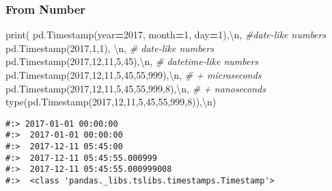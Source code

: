 \documentclass[
]{book}
\newenvironment{Shaded}{\begin{snugshade}}{\end{snugshade}}
\newcommand{\BuiltInTok}[1]{#1}
\newcommand{\CharTok}[1]{\textcolor[rgb]{0.5,0.5,0.5}{#1}}
\newcommand{\CommentTok}[1]{\textcolor[rgb]{0.37,0.37,0.37}{\textit{#1}}}
\newcommand{\DecValTok}[1]{\textcolor[rgb]{0.06,0.06,0.06}{#1}}
\newcommand{\NormalTok}[1]{#1}
\newcommand{\OperatorTok}[1]{\textcolor[rgb]{0.43,0.43,0.43}{\textbf{#1}}}
\newcommand{\StringTok}[1]{\textcolor[rgb]{0.5,0.5,0.5}{#1}}
\begin{document}
\hypertarget{from-number}{%
\subsubsection{From Number}\label{from-number}}

\begin{Shaded}
\begin{Highlighting}[]
\BuiltInTok{print}\NormalTok{( pd.Timestamp(year}\OperatorTok{=}\DecValTok{2017}\NormalTok{, month}\OperatorTok{=}\DecValTok{1}\NormalTok{, day}\OperatorTok{=}\DecValTok{1}\NormalTok{),}\StringTok{\textquotesingle{}}\CharTok{\textbackslash{}n}\StringTok{\textquotesingle{}}\NormalTok{,  }\CommentTok{\#date{-}like numbers}
\NormalTok{       pd.Timestamp(}\DecValTok{2017}\NormalTok{,}\DecValTok{1}\NormalTok{,}\DecValTok{1}\NormalTok{), }\StringTok{\textquotesingle{}}\CharTok{\textbackslash{}n}\StringTok{\textquotesingle{}}\NormalTok{,                  }\CommentTok{\# date{-}like numbers}
\NormalTok{       pd.Timestamp(}\DecValTok{2017}\NormalTok{,}\DecValTok{12}\NormalTok{,}\DecValTok{11}\NormalTok{,}\DecValTok{5}\NormalTok{,}\DecValTok{45}\NormalTok{),}\StringTok{\textquotesingle{}}\CharTok{\textbackslash{}n}\StringTok{\textquotesingle{}}\NormalTok{,            }\CommentTok{\# datetime{-}like numbers}
\NormalTok{       pd.Timestamp(}\DecValTok{2017}\NormalTok{,}\DecValTok{12}\NormalTok{,}\DecValTok{11}\NormalTok{,}\DecValTok{5}\NormalTok{,}\DecValTok{45}\NormalTok{,}\DecValTok{55}\NormalTok{,}\DecValTok{999}\NormalTok{),}\StringTok{\textquotesingle{}}\CharTok{\textbackslash{}n}\StringTok{\textquotesingle{}}\NormalTok{,     }\CommentTok{\# + microseconds}
\NormalTok{       pd.Timestamp(}\DecValTok{2017}\NormalTok{,}\DecValTok{12}\NormalTok{,}\DecValTok{11}\NormalTok{,}\DecValTok{5}\NormalTok{,}\DecValTok{45}\NormalTok{,}\DecValTok{55}\NormalTok{,}\DecValTok{999}\NormalTok{,}\DecValTok{8}\NormalTok{),}\StringTok{\textquotesingle{}}\CharTok{\textbackslash{}n}\StringTok{\textquotesingle{}}\NormalTok{,   }\CommentTok{\# + nanoseconds}
       \BuiltInTok{type}\NormalTok{(pd.Timestamp(}\DecValTok{2017}\NormalTok{,}\DecValTok{12}\NormalTok{,}\DecValTok{11}\NormalTok{,}\DecValTok{5}\NormalTok{,}\DecValTok{45}\NormalTok{,}\DecValTok{55}\NormalTok{,}\DecValTok{999}\NormalTok{,}\DecValTok{8}\NormalTok{)),}\StringTok{\textquotesingle{}}\CharTok{\textbackslash{}n}\StringTok{\textquotesingle{}}\NormalTok{)}
\end{Highlighting}
\end{Shaded}

\begin{verbatim}
#:> 2017-01-01 00:00:00 
#:>  2017-01-01 00:00:00 
#:>  2017-12-11 05:45:00 
#:>  2017-12-11 05:45:55.000999 
#:>  2017-12-11 05:45:55.000999008 
#:>  <class 'pandas._libs.tslibs.timestamps.Timestamp'>
\end{verbatim}
\end{document}
